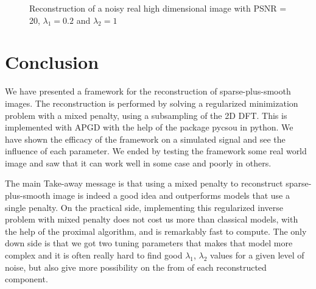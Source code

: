 \documentclass[a4paper,11pt,oneside]{report}
\theoremstyle{named}
\begin{document}
\begin{figure}
    \centering
    \caption{Reconstruction of a noisy real high dimensional image with PSNR = 20, $\lambda_1 = 0.2$ and $\lambda_2 = 1$}
    \label{fig:h2n}
\end{figure}


\chapter{Conclusion}
We have presented a framework for the reconstruction of sparse-plus-smooth images. The reconstruction is performed by solving a regularized minimization problem with a mixed penalty, using a subsampling of the 2D DFT. This is implemented with APGD with the help of the package pycsou in python. We have shown the efficacy of the framework on a simulated signal and see the influence of each parameter. We ended by testing the framework some real world image and saw that it can work well in some case and poorly in others.

The main Take-away message is that using a mixed penalty to reconstruct sparse-plus-smooth image is indeed a good idea and outperforms models that use a single penalty. On the practical side, implementing this regularized inverse problem with mixed penalty does not cost us more than classical models, with the help of the proximal algorithm, and is remarkably fast to compute. The only down side is that we got two tuning parameters that makes that model more complex and it is often really hard to find good $\lambda_1$, $\lambda_2$ values for a given level of noise, but also give more possibility on the from of each reconstructed component.

{}

\end{document}
